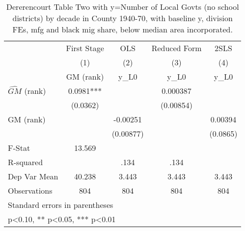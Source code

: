 \begin{table}[htbp]\centering
\def\sym#1{\ifmmode^{#1}\else\(^{#1}\)\fi}
\caption{Dererencourt Table Two with y=Number of Local Govts (no school districts) by decade in County 1940-70, with baseline y, division FEs, mfg and black mig share, below median area incorporated.}
\begin{tabular}{l*{4}{c}}
\toprule
                    & First Stage   &         OLS   &Reduced Form   &        2SLS   \\
                    &\multicolumn{1}{c}{(1)}&\multicolumn{1}{c}{(2)}&\multicolumn{1}{c}{(3)}&\multicolumn{1}{c}{(4)}\\
                    &\multicolumn{1}{c}{GM  (rank)}&\multicolumn{1}{c}{y\_L0}&\multicolumn{1}{c}{y\_L0}&\multicolumn{1}{c}{y\_L0}\\
\midrule
$\hat{GM}$ (rank)   &      0.0981***&               &    0.000387   &               \\
                    &    (0.0362)   &               &   (0.00854)   &               \\
\addlinespace
GM  (rank)          &               &    -0.00251   &               &     0.00394   \\
                    &               &   (0.00877)   &               &    (0.0865)   \\
\midrule
F-Stat              &      13.569   &               &               &               \\
R-squared           &               &        .134   &        .134   &               \\
Dep Var Mean        &      40.238   &       3.443   &       3.443   &       3.443   \\
Observations        &         804   &         804   &         804   &         804   \\
\bottomrule
\multicolumn{5}{l}{\footnotesize Standard errors in parentheses}\\
\multicolumn{5}{l}{\footnotesize * p<0.10, ** p<0.05, *** p<0.01}\\
\end{tabular}
\end{table}
